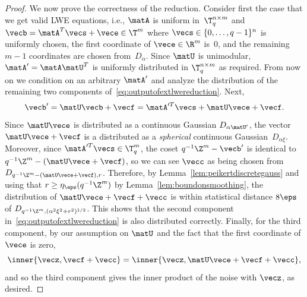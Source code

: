 \begin{proof}
We now prove the correctness of the reduction. Consider first the case that we get valid LWE equations, i.e.,
$\matA$ is uniform in~$\T_q^{n \times m}$ and $\vecb = \matA^T \vecs + \vece \in \T^m$
where $\vecs \in \{0,\ldots,q-1\}^n$ is uniformly chosen, the first coordinate of $\vece \in \R^m$ is~$0$, 
and the remaining $m-1$ coordinates are chosen from~$D_\alpha$.
Since $\matU$ is unimodular, $\matA' = \matA \matU^T$ is uniformly distributed in $\T_q^{n \times m}$ as required.
From now on we condition on an arbitrary $\matA'$ and analyze the distribution of the remaining two
components of~\eqref{eq:outputofextlwereduction}.
Next,
\[
\vecb' =
\matU \vecb + \vecf =
\matA'^T \vecs + \matU \vece + \vecf.
\]
Since $\matU \vece$ is distributed as a continuous Gaussian $D_{\alpha \matU'}$,
the vector~$\matU \vece + \vecf$ is a distributed as a \emph{spherical} continuous 
Gaussian~$D_{\alpha \xi}$.
Moreover, since $\matA'^T \vecs \in \T_q^m$, the coset $q^{-1}\Z^m - \vecb'$ is identical to
$q^{-1}\Z^m - (\matU \vece + \vecf)$, so we can see $\vecc$ as being chosen from
$D_{q^{-1}\Z^m - (\matU \vece + \vecf),r}$. Therefore, by Lemma~\ref{lem:peikertdiscretegauss}
and using that $r \ge \eta_\eps(q^{-1}\Z^m)$ 
by Lemma~\ref{lem:boundonsmoothing},
the distribution of $\matU \vece + \vecf + \vecc$ is within statistical distance $8 \eps$ 
of $D_{q^{-1}\Z^m,(\alpha^2 \xi^2 + r^2)^{1/2}}$. This shows that the second
component in~\eqref{eq:outputofextlwereduction} is also distributed correctly.
Finally, for the third component, by our assumption on $\matU$ and the fact that the
first coordinate of $\vece$ is zero,
\[
\inner{\vecz, \vecf + \vecc} = \inner{\vecz, \matU\vece + \vecf + \vecc},
\]
and so the third component gives the inner product of the noise with $\vecz$, as desired.


\end{proof}
